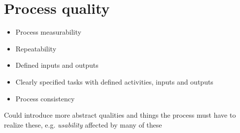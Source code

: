 \section{Process quality}

\begin{itemize}
  \item Process measurability
  \item Repeatability
  \item Defined inputs and outputs
  \item Clearly specified tasks with defined activities, inputs and outputs
  \item Process consistency
\end{itemize}

Could introduce more abstract qualities and things the process must have to realize these, e.g. \emph{usability} affected by many of these
